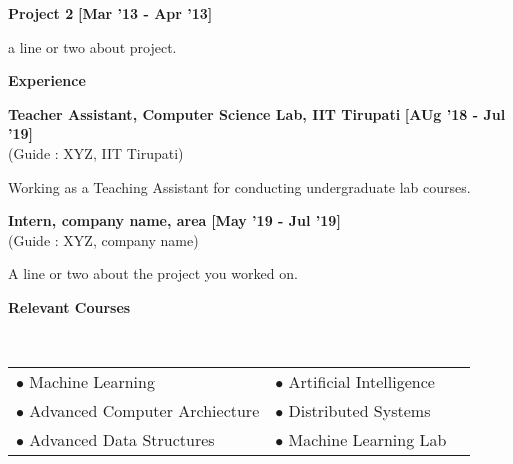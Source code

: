 \documentclass[a4paper,10pt]{article}
\begin{document}
\begin{itemize*}
  \setlength{\itemsep}{1pt}
  \item \textbf{\small{Project 2}} \hfill {\small{{\textbf{[Mar '13 - Apr '13]}}}\/} 
\begin{itemize*}
	\item a line or two about project.
\end{itemize*}
\end{itemize*}

\colorbox{titleColor}{\parbox{6.7in}{\textbf{Experience}}}
\begin{itemize*}
  \setlength{\itemsep}{.00pt}
  \item \textbf{{Teacher Assistant, Computer Science Lab, IIT Tirupati}} \hfill {\small{{\textbf{[AUg '18 - Jul '19]}}\/}} \\
{(Guide : XYZ, IIT Tirupati)}
      \begin{itemize*}
       \item Working as a Teaching Assistant for conducting undergraduate lab courses.
      \end{itemize*}
     \end{itemize*}
\begin{itemize*}
  \setlength{\itemsep}{.00pt}
  \item \textbf{{Intern, company name, area}} \hfill {\small{{\textbf{[May '19 - Jul '19]}}\/}} \\
{(Guide : XYZ, company name)}
      \begin{itemize*}
       \item A line or two about the project you worked on.
      \end{itemize*}
     \end{itemize*}

\colorbox{titleColor}{\parbox{6.7in}{\textbf{Relevant Courses}}}\\[0.08in]
\begin{tabular}{p{3.5in}p{3in}p{2.5in}}
\hspace{0.9pc}$\bullet$ Machine Learning &$\bullet$ Artificial Intelligence\\[0.05in]
\hspace{0.9pc}$\bullet$ Advanced Computer Archiecture&$\bullet$ Distributed Systems\\[0.05in]
\hspace{0.9pc}$\bullet$ Advanced Data Structures&$\bullet$ Machine Learning Lab \\[0.05in]
\end{tabular}
\end{document}
